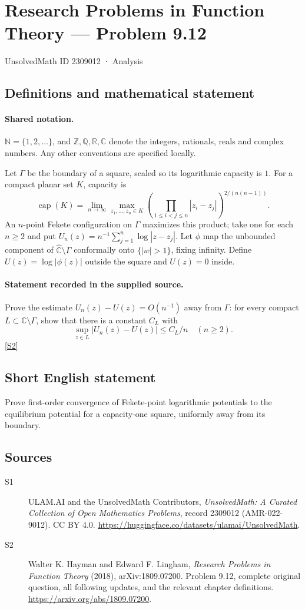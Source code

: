 \documentclass[11pt]{book}
\newcommand{\sref}[2]{\hyperlink{source:#1:#2}{[S#2]}}
\begin{document}
\setcounter{section}{2309011}
\section{Research Problems in Function Theory — Problem 9.12}\label{2309012}
{\small\sffamily UnsolvedMath ID 2309012 · Analysis}
\subsection{Definitions and mathematical statement}

\paragraph{Shared notation.}$\mathbb N=\{1,2,\ldots\}$, and $\mathbb Z,\mathbb Q,\mathbb R,\mathbb C$ denote the integers, rationals, reals and complex numbers. Any other conventions are specified locally.


Let $\Gamma$ be the boundary of a square, scaled so its logarithmic capacity is $1$. For a compact planar set $K$, capacity is \[\operatorname{cap}(K)=\lim_{n\to\infty}\max_{z_1,\ldots,z_n\in K}\left(\prod_{1\le i<j\le n}|z_i-z_j|\right)^{2/(n(n-1))}.\] An $n$-point Fekete configuration on $\Gamma$ maximizes this product; take one for each $n\ge2$ and put $U_n(z)=n^{-1}\sum_{j=1}^n\log|z-z_j|$. Let $\phi$ map the unbounded component of $\widehat{\mathbb C}\setminus\Gamma$ conformally onto $\{|w|>1\}$, fixing infinity. Define $U(z)=\log|\phi(z)|$ outside the square and $U(z)=0$ inside.
\paragraph{Statement recorded in the supplied source.}
Prove the estimate $U_n(z)-U(z)=O(n^{-1})$ away from $\Gamma$: for every compact $L\subset\mathbb C\setminus\Gamma$, show that there is a constant $C_L$ with \[\sup_{z\in L}|U_n(z)-U(z)|\le C_L/n\quad(n\ge2).\] \sref{2309012}{2}
\subsection{Short English statement}
Prove first-order convergence of Fekete-point logarithmic potentials to the equilibrium potential for a capacity-one square, uniformly away from its boundary.
\subsection{Sources}
\begin{description}
\item[\hypertarget{source:2309012:1}{S1}] ULAM.AI and the UnsolvedMath Contributors, \emph{UnsolvedMath: A Curated Collection of Open Mathematics Problems}, record 2309012 (AMR-022-9012). CC BY 4.0. \url{https://huggingface.co/datasets/ulamai/UnsolvedMath}.
\item[\hypertarget{source:2309012:2}{S2}] Walter K. Hayman and Edward F. Lingham, \emph{Research Problems in Function Theory} (2018), arXiv:1809.07200. Problem 9.12, complete original question, all following updates, and the relevant chapter definitions. \url{https://arxiv.org/abs/1809.07200}.
\end{description}
\label{end:2309012}
\end{document}

